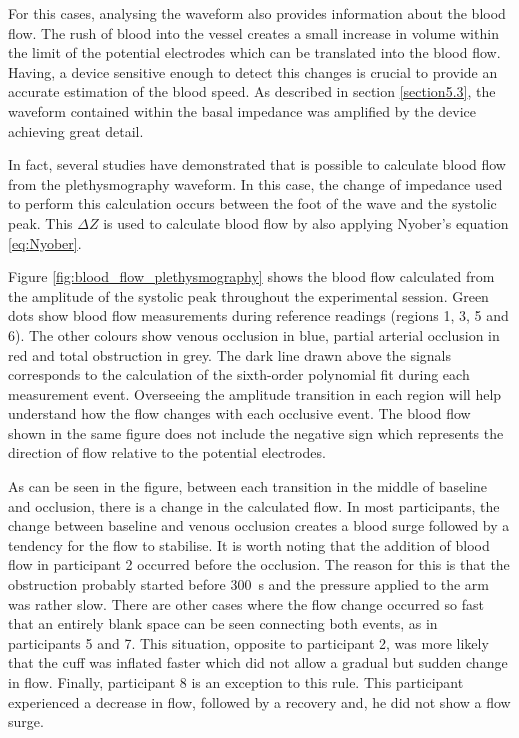 For this cases, analysing the waveform also provides information about the blood flow.  The rush of blood into the vessel creates a small increase in volume within the limit of the potential electrodes which can be translated into the blood flow. Having, a device sensitive enough to detect this changes is crucial to provide an accurate estimation of the blood speed. As described in section \ref{section5.3}, the waveform contained within the basal impedance was amplified by the device achieving great detail. 

In fact, several studies  have demonstrated that is possible to calculate blood flow from the plethysmography waveform. In this case, the change of impedance used to perform this calculation occurs between the foot of the wave and the systolic peak. This $\Delta Z$ is used to calculate blood flow by also applying Nyober's equation \ref{eq:Nyober}. 

Figure \ref{fig:blood_flow_plethysmography} shows the blood flow calculated from the amplitude of the systolic peak throughout the experimental session. Green dots show blood flow measurements during reference readings (regions 1, 3, 5 and 6). The other colours show venous occlusion in blue, partial arterial occlusion in red and total obstruction in grey. The dark line drawn above the signals corresponds to the calculation of the sixth-order polynomial fit during each measurement event. Overseeing the amplitude transition in each region will help understand how the flow changes with each occlusive event. The blood flow shown in the same figure does not include the negative sign which represents the direction of flow relative to the potential electrodes.

As can be seen in the figure, between each transition in the middle of baseline and occlusion, there is a change in the calculated flow. In most participants, the change between baseline and venous occlusion creates a blood surge followed by a tendency for the flow to stabilise. It is worth noting that the addition of blood flow in participant 2 occurred before the occlusion. The reason for this is that the obstruction probably started before \SI{300}{\second} and the pressure applied to the arm was rather slow. There are other cases where the flow change occurred so fast that an entirely blank space can be seen connecting both events, as in participants 5 and 7. This situation, opposite to participant 2, was more likely that the cuff was inflated faster which did not allow a gradual but sudden change in flow. Finally, participant 8 is an exception to this rule. This participant experienced a decrease in flow, followed by a recovery and, he did not show a flow surge.

